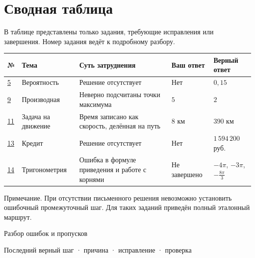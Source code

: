 \documentclass[a4paper,12pt]{article}
\begin{document}
\section*{Сводная таблица}
В таблице представлены только задания, требующие исправления или завершения. Номер задания ведёт к подробному разбору.
\par\medskip
{\small\renewcommand{\arraystretch}{1.4}
\begin{tabularx}{\linewidth}{@{}>{\centering\arraybackslash}p{10mm} >{\raggedright\arraybackslash}p{28mm} X >{\raggedright\arraybackslash}p{24mm} >{\raggedright\arraybackslash}p{32mm}@{}}
\toprule
№ & Тема & Суть затруднения & Ваш ответ & Верный ответ \\
\midrule
\hyperref[task:5]{5} & Вероятность & Решение отсутствует & Нет & $0{,}15$ \\
\hyperref[task:9]{9} & Производная & Неверно подсчитаны точки максимума & $5$ & $2$ \\
\hyperref[task:11]{11} & Задача на движение & Время записано как скорость, делённая на путь & $8$ км & $390$ км \\
\hyperref[task:13]{13} & Кредит & Решение отсутствует & Нет & $1\,594\,200$ руб. \\
\hyperref[task:14]{14} & Тригонометрия & Ошибка в формуле приведения и работе с корнями & Не завершено & $-4\pi$, $-3\pi$, $-\frac{8\pi}{3}$ \\
\bottomrule
\end{tabularx}}
\par\medskip
\textcolor{muted}{Примечание.} При отсутствии письменного решения невозможно установить ошибочный промежуточный шаг. Для таких заданий приведён полный эталонный маршрут.
\clearpage
\thispagestyle{empty}
\vspace*{.32\textheight}
\begin{center}
{\LARGE\textcolor{accent}{Разбор ошибок и пропусков}}\par\vspace{9mm}
{\large Последний верный шаг · причина · исправление · проверка}
\end{center}
\end{document}

